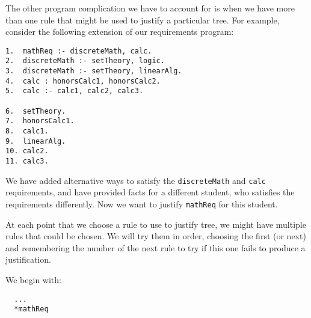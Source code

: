 The other program complication we have to account for is when we have
more than one rule that might be used to justify a particular tree.
For example, consider the following extension of our requirements
program:

\begin{verbatim}
1.  mathReq :- discreteMath, calc.
2.  discreteMath :- setTheory, logic.
3.  discreteMath :- setTheory, linearAlg.
4.  calc : honorsCalc1, honorsCalc2.
5.  calc :- calc1, calc2, calc3.

6.  setTheory.
7.  honorsCalc1.
8.  calc1.
9.  linearAlg.
10. calc2.
11. calc3.
\end{verbatim}

We have added alternative ways to satisfy the {\tt discreteMath} and
{\tt calc} requirements, and have provided facts for a different
student, who satisfies the requirements differently.  Now we want to
justify {\tt mathReq} for this student.

At each point that we choose a rule to use to justify tree, we might
have multiple rules that could be chosen.  We will try them in order,
choosing the first (or next) and remembering the number of the next
rule to try if this one fails to produce a justification.

We begin with:

\begin{verbatim}
  ...
  *mathReq
\end{verbatim}

